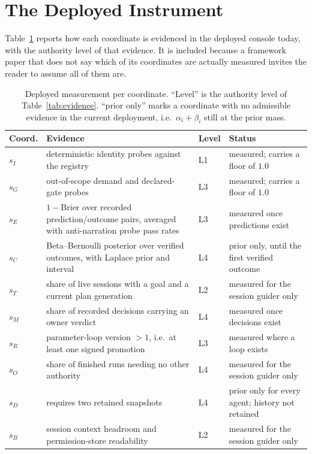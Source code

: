 \documentclass[11pt]{article}
\begin{document}
\section{The Deployed Instrument}
\label{app:deployed}

Table~\ref{tab:deployed} reports how each coordinate is evidenced in the deployed console today, with the authority level of that evidence. It is included because a framework paper that does not say which of its coordinates are actually measured invites the reader to assume all of them are.

\begin{table}[h]
\centering\footnotesize
\caption{Deployed measurement per coordinate. ``Level'' is the authority level of Table~\ref{tab:evidence}. ``prior only'' marks a coordinate with no admissible evidence in the current deployment, i.e.\ $\alpha_i+\beta_i$ still at the prior mass.}
\label{tab:deployed}
\begin{tabular}{p{0.8cm} p{6.6cm} p{1.0cm} p{6.0cm}}
\toprule
\textbf{Coord.} & \textbf{Evidence} & \textbf{Level} & \textbf{Status} \\
\midrule
$s_I$ & deterministic identity probes against the registry & L1 & measured; carries a floor of $1.0$ \\
$s_G$ & out-of-scope demand and declared-gate probes & L3 & measured; carries a floor of $1.0$ \\
$s_E$ & $1 - \text{Brier}$ over recorded prediction/outcome pairs, averaged with anti-narration probe pass rates & L3 & measured once predictions exist \\
$s_C$ & Beta--Bernoulli posterior over verified outcomes, with Laplace prior and interval & L4 & prior only, until the first verified outcome \\
$s_T$ & share of live sessions with a goal and a current plan generation & L2 & measured for the session guider only \\
$s_M$ & share of recorded decisions carrying an owner verdict & L4 & measured once decisions exist \\
$s_R$ & parameter-loop version $>1$, i.e.\ at least one signed promotion & L3 & measured where a loop exists \\
$s_O$ & share of finished runs needing no other authority & L4 & measured for the session guider only \\
$s_D$ & requires two retained snapshots & L4 & prior only for every agent; history not retained \\
$s_B$ & session context headroom and permission-store readability & L2 & measured for the session guider only \\
\bottomrule
\end{tabular}
\end{table}
\end{document}
